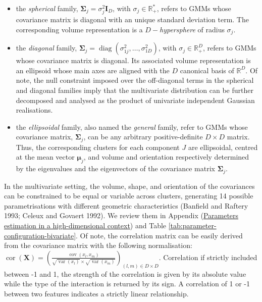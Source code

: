 \begin{itemize}
\tightlist
\item
  the \emph{spherical} family, \(\boldsymbol{\Sigma}_j=\sigma_j^2 \boldsymbol{I}_D\), with \(\sigma_j \in \mathbb{R}_{+}^*\), refers to GMMs whose covariance matrix is diagonal with an unique standard deviation term. The corresponding volume representation is a \(D-\)\emph{hypersphere} of radius \(\sigma_j\).
\item
  the \emph{diagonal} family, \(\boldsymbol{\Sigma}_j=\operatorname{diag} \left(\sigma_{1j}^2, \ldots, \sigma_{1D}^2\right)\), with \(\sigma_j \in \mathbb{R}_{+}^D\), refers to GMMs whose covariance matrix is diagonal. Its associated volume representation is an ellipsoid whose main axes are aligned with the \(D\) canonical basis of \(\mathbb{R}^D\). Of note, the null constraint imposed over the off-diagonal terms in the spherical and diagonal families imply that the multivariate distribution can be further decomposed and analysed as the product of univariate independent Gaussian realisations.
\item
  the \emph{ellipsoidal} family, also named the \emph{general} family, refer to GMMs whose covariance matrix, \(\boldsymbol{\Sigma}_j\), can be any arbitrary positive-definite \(D \times D\) matrix. Thus, the corresponding clusters for each component \(J\) are ellipsoidal, centred at the mean vector \(\boldsymbol{\mu}_j\), and volume and orientation respectively determined by the eigenvalues and the eigenvectors of the covariance matrix \(\boldsymbol{\Sigma}_j\).
\end{itemize}

In the multivariate setting, the volume, shape, and orientation of the covariances can be constrained to be equal or variable across clusters, generating 14 possible parametrisations with different geometric characteristics (Banfield and Raftery 1993; Celeux and Govaert 1992). We review them in Appendix (\protect\hyperlink{parameters-estimation-in-a-high-dimensional-context}{Parameters estimation in a high-dimensional context}) and Table \ref{tab:parameter-configuration-bivariate}. Of note, the
correlation matrix can be easily derived from the covariance
matrix with the following normalisation:
\(\operatorname{cor}(\boldsymbol{X})=\left(\frac{\operatorname{cov}(x_l, x_m)}{\sqrt{\operatorname{var}(x_l)} \times \sqrt{\operatorname{var}(x_m)}}\right)_{(l,m) \in D \times D}\). Correlation if strictly included between -1 and 1, the strength of the
correlation is given by its absolute value while the type of the
interaction is returned by its sign. A correlation of 1 or -1 between two features indicates a strictly linear relationship.

